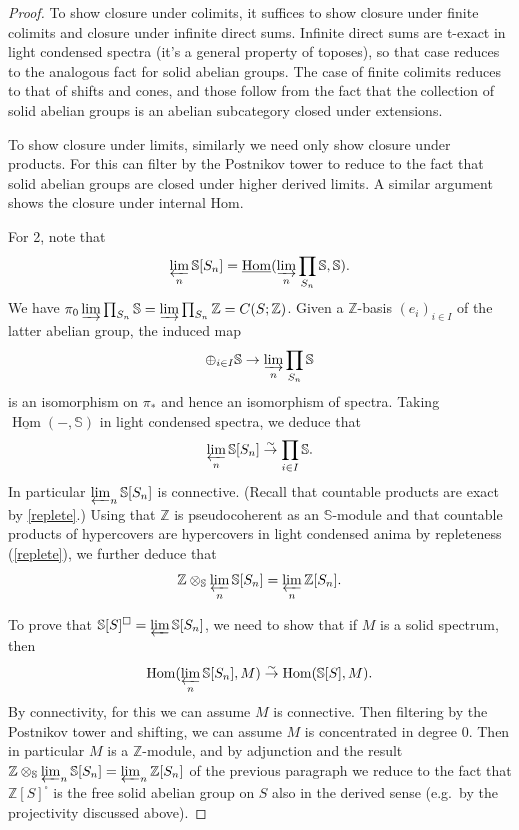 \documentclass[12pt]{article}
\newcommand{\on}{\operatorname}
\begin{document}
\begin{proof}
To show closure under colimits, it suffices to show closure under finite colimits and closure under infinite direct sums.  Infinite direct sums are t-exact in light condensed spectra (it's a general property of toposes), so that case reduces to the analogous fact for solid abelian groups.  The case of finite colimits reduces to that of shifts and cones, and those follow from the fact that the collection of solid abelian groups is an abelian subcategory closed under extensions.

To show closure under limits, similarly we need only show closure under products.  For this can filter by the Postnikov tower to reduce to the fact that solid abelian groups are closed under higher derived limits.  A similar argument shows the closure under internal Hom.

For 2, note that
$$\varprojlim_n \mathbb{S}[S_n] = \underline{\on{Hom}}(\varinjlim_n \prod_{S_n} \mathbb{S}, \mathbb{S}).$$
We have $\pi_0 \varinjlim \prod_{S_n}\mathbb{S} = \varinjlim \prod_{S_n}\mathbb{Z}=C(S;\mathbb{Z})$.  Given a $\mathbb{Z}$-basis $(e_i)_{i\in I}$ of the latter abelian group, the induced map
$$\oplus_{i\in I}\mathbb{S} \to \varinjlim_n \prod_{S_n}\mathbb{S}$$
is an isomorphism on $\pi_\ast$ and hence an isomorphism of spectra.  Taking $\underline{\on{Hom}}(-,\mathbb{S})$ in light condensed spectra, we deduce that
$$\varprojlim_n \mathbb{S}[S_n]\overset{\sim}{\rightarrow}\prod_{i\in I} \mathbb{S}.$$
In particular $\varprojlim_n \mathbb{S}[S_n]$ is connective.  (Recall that countable products are exact by \ref{replete}.) Using that $\mathbb{Z}$ is pseudocoherent as an $\mathbb{S}$-module and that countable products of hypercovers are hypercovers in light condensed anima by repleteness (\ref{replete}), we further deduce that
$$\mathbb{Z}\otimes_{\mathbb{S}}\varprojlim_n \mathbb{S}[S_n] = \varprojlim_n \mathbb{Z}[S_n].$$

To prove that $\mathbb{S}[S]^\square= \varprojlim \mathbb{S}[S_n]$, we need to show that if $M$ is a solid spectrum, then
$$\on{Hom}(\varprojlim_n \mathbb{S}[S_n],M)\overset{\sim}{\to} \on{Hom}(\mathbb{S}[S],M).$$
By connectivity, for this we can assume $M$ is connective.  Then filtering by the Postnikov tower and shifting, we can assume $M$ is concentrated in degree $0$.  Then in particular $M$ is a $\mathbb{Z}$-module, and by adjunction and the result $\mathbb{Z}\otimes_{\mathbb{S}}\varprojlim_n \mathbb{S}[S_n] = \varprojlim_n \mathbb{Z}[S_n]$ of the previous paragraph we reduce to the fact that $\mathbb{Z}[S]^\square$ is the free solid abelian group on $S$ also in the derived sense (e.g.\ by the projectivity discussed above).
\end{proof}
\end{document}
